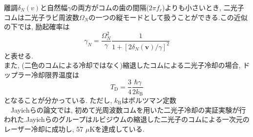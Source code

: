 \documentclass[uplatex, dvipdfmx, a4paper, report, papersize, 11pt]{jsbook}
\begin{document}
離調$\delta _{N}\left( v\right)$と自然幅$\gamma$の両方がコムの歯の間隔($2\pi f_r$)よりも小さいとき, 二光子コムは二光子ラビ周波数$\Omega_N$の一つの縦モードとして扱うことができる.この近似の下では, 励起確率は
\begin{equation}\label{EffectiveExcitationRate}
\gamma_N = \frac{\Omega^2_N}{\gamma}\frac{1}{1 + [2\delta_N(\bm{v})/\gamma]^2}
\end{equation}
と表せる.\\
 また, (二色のコムによる冷却ではなく)縮退したコムによる二光子冷却の場合, ドップラー冷却限界温度は
\begin{equation}
  T_\mathrm{D} = \frac{3}{4}\frac{\hbar\gamma}{2k_\mathrm{B}}
\end{equation}
となることが分かっている. ただし, $k_\mathrm{B}$はボルツマン定数\\
　Jayichらの論文\cite{PhysRevX.6.041004}では, 初めて光周波数コムを用いた二光子冷却の実証実験が行われた.Jayichらのグループはルビジウムの縮退した二光子のコムによる一次元のレーザー冷却に成功し, 57 $\mu$Kを達成している.
\end{document}
